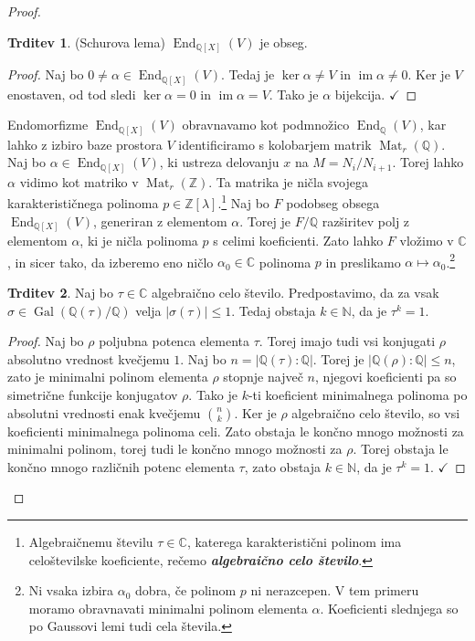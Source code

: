 \documentclass[11pt]{book}
\def\NN{\mathbb{N}}
\def\ZZ{\mathbb{Z}}
\def\QQ{\mathbb{Q}}
\def\CC{\mathbb{C}}
\DeclareMathOperator\image{im}
\DeclareMathOperator\Gal{Gal}
\DeclareMathOperator\End{End}
\DeclareMathOperator\Mat{Mat}
\def\definicija{\color{rdeca}\bf\em}
\def\kljuka{$\checkmark$}
\theoremstyle{definition}
\theoremstyle{zgled}
\theoremstyle{odprtproblem}
\theoremstyle{domacanaloga}
\newenvironment{dokaz}
    {\color{siva}\begin{proof}}
    {\end{proof}}
\theoremstyle{izrek}
\newtheorem*{trditev}{Trditev}
\begin{document}
\begin{dokaz}
\begin{trditev}
{\sc (Schurova lema)} $\End_{\QQ[X]}(V)$ je obseg.  
\end{trditev}


\begin{dokaz}
Naj bo $0 \neq \alpha \in \End_{\QQ[X]}(V)$. Tedaj je $\ker \alpha \neq V$ in $\image \alpha \neq 0$. Ker je $V$ enostaven, od tod sledi $\ker \alpha = 0$ in $\image \alpha = V$. Tako je $\alpha$ bijekcija. \kljuka
\end{dokaz}


Endomorfizme $\End_{\QQ[X]}(V)$ obravnavamo kot podmnožico $\End_\QQ(V)$, kar lahko z izbiro baze prostora $V$ identificiramo s kolobarjem matrik $\Mat_r(\QQ)$.
Naj bo $\alpha \in \End_{\QQ[X]}(V)$, ki ustreza delovanju $x$ na $M = N_i/N_{i+1}$. Torej lahko $\alpha$ vidimo kot matriko v $\Mat_r(\ZZ)$. Ta matrika je ničla svojega karakterističnega polinoma $p \in \ZZ[\lambda]$.\footnote{Algebraičnemu številu $\tau \in \CC$, katerega karakteristični polinom ima celoštevilske koeficiente, rečemo {\definicija algebraično celo število}.} Naj bo $F$ podobseg obsega $\End_{\QQ[X]}(V)$, generiran z elementom $\alpha$. Torej je $F/\QQ$ razširitev polj z elementom $\alpha$, ki je ničla polinoma $p$ s celimi koeficienti. Zato lahko $F$ vložimo v $\CC$, in sicer tako, da izberemo eno ničlo $\alpha_0 \in \CC$ polinoma $p$ in preslikamo $\alpha \mapsto \alpha_0$.\footnote{Ni vsaka izbira $\alpha_0$ dobra, če polinom $p$ ni nerazcepen. V tem primeru moramo obravnavati minimalni polinom elementa $\alpha$. Koeficienti slednjega so po Gaussovi lemi tudi cela števila.}

\begin{trditev}
Naj bo $\tau \in \CC$ algebraično celo število. Predpostavimo, da za vsak $\sigma \in \Gal(\QQ(\tau)/\QQ)$ velja $|\sigma(\tau)| \leq 1$. Tedaj obstaja $k \in \NN$, da je $\tau^k = 1$.
\end{trditev}

\begin{dokaz}
Naj bo $\rho$ poljubna potenca elementa $\tau$. Torej imajo tudi vsi konjugati $\rho$ absolutno vrednost kvečjemu $1$. Naj bo $n = |\QQ(\tau):\QQ|$. Torej je $|\QQ(\rho) : \QQ| \leq n$, zato je minimalni polinom elementa $\rho$ stopnje največ $n$, njegovi koeficienti pa so simetrične funkcije konjugatov $\rho$. Tako je $k$-ti koeficient minimalnega polinoma po absolutni vrednosti enak kvečjemu $\binom{n}{k}$. Ker je $\rho$ algebraično celo število, so vsi koeficienti minimalnega polinoma celi. Zato obstaja le končno mnogo možnosti za minimalni polinom, torej tudi le končno mnogo možnosti za $\rho$. Torej obstaja le končno mnogo različnih potenc elementa $\tau$, zato obstaja $k \in \NN$, da je $\tau^k = 1$. \kljuka
\end{dokaz}



\end{dokaz}
\end{document}
